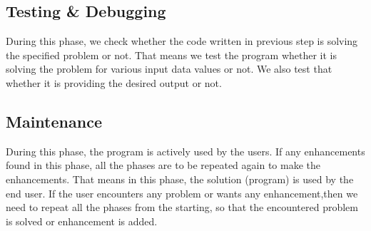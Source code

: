 \documentclass[18 pt]{article}
\begin{document}
\begin{large}
\begin{flushleft}
\subsection{Testing & Debugging}
During this phase, we check whether the code written in previous step is solving the specified problem or not. That means we test the program whether it is solving the problem for various input data values or not. We also test that whether it is providing the desired output or not.
\subsection{Maintenance}
During this phase, the program is actively used by the users. If any enhancements found in this phase, all the phases are to be repeated again to make the enhancements. That means in this phase, the solution (program) is used by the end user. If the user encounters any problem or wants any enhancement,then we need to repeat all the phases from the starting, so that the encountered problem is solved or enhancement is added.

\end{flushleft}
\end{large}
\end{document}

